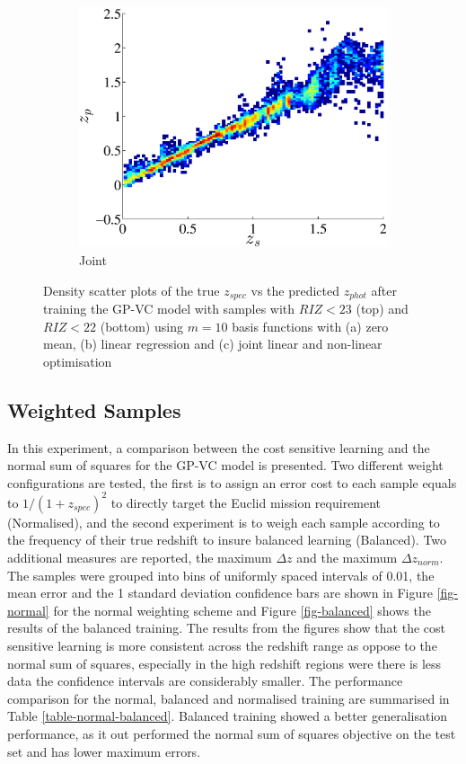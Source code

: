 \documentclass[useAMS,usenatbib,fleqn]{mn2e}
\begin{document}
\begin{figure}
\begin{subfigure}[b]{0.3\columnwidth}
                \includegraphics[width=\textwidth]{figures/22_J.eps}
                \caption{Joint}
        \end{subfigure}
        
        \caption{Density scatter plots of the true $z_{spec}$ vs the predicted $z_{phot}$ after training the GP-VC model with samples with $RIZ<23$ (top) and $RIZ<22$ (bottom) using $m=10$ basis functions with (a) zero mean, (b) linear regression and (c) joint linear and non-linear optimisation}
        \label{fig-RIZ-splits}
\end{figure}


\subsection{Weighted Samples}
In this experiment, a comparison between the cost sensitive learning and the normal sum of squares for the GP-VC model is presented. Two different weight configurations are tested, the first is to assign an error cost to each sample equals to $1/\left(1+z_{spec}\right)^{2}$ to directly target the Euclid mission requirement (Normalised), and the second experiment is to weigh each sample according to the frequency of their true redshift to insure balanced learning (Balanced).  Two additional measures are reported, the maximum $\Delta z$ and the maximum $\Delta z_{norm}$. The samples were grouped into bins of uniformly spaced intervals of 0.01, the mean error and the 1 standard deviation confidence bars are shown in Figure \ref{fig-normal} for the normal weighting scheme and Figure \ref{fig-balanced} shows the results of the balanced training. The results from the figures show that the cost sensitive learning is more consistent across the redshift range as oppose to the normal sum of squares, especially in the high redshift regions were there is less data the confidence intervals are considerably smaller. The performance comparison for the normal, balanced and normalised training are summarised in Table \ref{table-normal-balanced}. Balanced training showed a better generalisation performance, as it out performed the normal sum of squares objective on the test set and has lower maximum errors.
\end{document}
